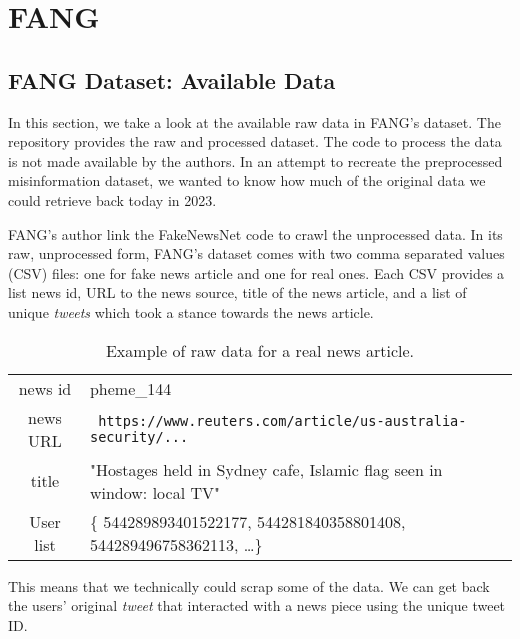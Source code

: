 
\chapter{FANG} %
\label{cha:fang}

\section{FANG Dataset: Available Data}

In this section, we take a look at the available raw data in FANG's dataset.
The repository provides the raw and processed dataset. 
The code to process the data is not made available by the authors.
In an attempt to recreate the preprocessed misinformation dataset, we wanted to know how much of the original data we could retrieve back today in 2023.

FANG's author link the FakeNewsNet code to crawl the unprocessed data.
In its raw, unprocessed form, FANG's dataset comes with two comma separated values (CSV) files: one for fake news article and one for real ones.
Each CSV provides a list news id, URL to the news source, title of the news article, and a list of unique \textit{tweets} which took a stance towards the news article.

\begin{table}[h]
    \caption{Example of raw data for a real news article.}
    \label{tab:fang_raw_data}
    \begin{tabular}{cl}
        \toprule
        news id & pheme\_144\\
        news URL & \verb| https://www.reuters.com/article/us-australia-security/...|\\
        title & "Hostages held in Sydney cafe, Islamic flag seen in window: local TV"\\
        User list & \{ 544289893401522177, 544281840358801408, 544289496758362113, \dots \} \\
        \bottomrule
    \end{tabular}
\end{table}

This means that we technically could scrap some of the data.
We can get back the users' original \textit{tweet} that interacted with a news piece using the unique tweet ID.

